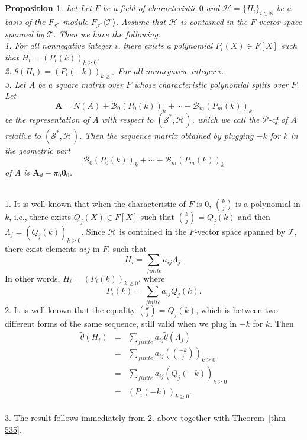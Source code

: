 \documentclass[12pt]{amsart}
\newtheorem{prop}[thrm]{Proposition}
\theoremstyle{definition}
\numberwithin{equation}{section}
\numberwithin{equation}{section}
\begin{document}
\begin{prop}\label{Prop : 010}  Let Let $F$ be a field of characteristic $0$ and $\mathcal{H}=\{H_{i}\}_{i\in \mathbb{N}}$ be a basis of the $F_{\mathcal{S}^{\ast}}$-module $F_{\mathcal{S}^{\ast}}\langle \mathcal{T} \rangle$. Assume that $\mathcal{H}$ is contained in the $F$-vector space spanned by $\mathcal{T}$. Then we have the following:
\\1. For all nonnegative integer $i$, there exists a polynomial $P_{i}(X)\in F[X]$ such that $H_{i}=(P_{i}(k))_{k\geq0}$.
\\2. $\widetilde{\theta}(H_{i})=(P_{i}(-k))_{k\geq0}$ For all nonnegative integer $i$.
\\3. Let $A$ be a square matrix over $F$ whose characteristic polynomial splits over $F$. Let $$\pmb{A}= N(A) + \mathcal{B}_{0}(P_{0}(k))_{k} + \cdots + \mathcal{B}_{m}(P_{m}(k))_{k}$$ be the representation of $A$ with respect to $(\mathcal{S}^{\ast}, \mathcal{H})$, which we call the $\mathcal{P}$-cf of $A$ relative to $(\mathcal{S}^{\ast}, \mathcal{H})$. Then the sequence matrix obtained by plugging $-k$ for $k$ in the geometric part $$\mathcal{B}_{0}(P_{0}(k))_{k} + \cdots + \mathcal{B}_{m}(P_{m}(k))_{k}$$ of $A$ is $\pmb{A}_{d}-\pi_{0}\pmb{0}_{0}$.
\end{prop}
\proof~
\\1. It is well known that when the characteristic of $F$ is $0$, $\binom{k}{j}$ is a polynomial in $k$, i.e., there exists $Q_{j}(X)\in F[X]$ such that $\binom{k}{j}=Q_{j}(k)$ and then $\Lambda_{j}=(Q_{j}(k))_{k\geq 0}$. Since $\mathcal{H}$ is contained in the $F$-vector space spanned by $\mathcal{T}$, there exist elements $aij$ in $F$, such that
$$H_{i}=\sum_{finite} a_{ij}\Lambda_{j}.$$
In other words, $H_{i}=(P_{i}(k))_{k\geq0}$, where
$$P_{i}(k)=\sum_{finite} a_{ij}Q_{j}(k).$$
2. It is well known that the equality $\binom{k}{j}=Q_{j}(k)$, which is between two different forms of the same sequence, still valid when we plug in $-k$ for $k$. Then
\begin{eqnarray*}
\widetilde{\theta}(H_{i})&=&\sum_{finite} a_{ij}\widetilde{\theta}(\Lambda_{j})\\
&=&\sum_{finite} a_{ij}(\binom{-k}{j})_{k\geq 0}\\
&=&\sum_{finite} a_{ij}(Q_{j}(-k))_{k\geq 0}\\
&=&(P_{i}(-k))_{k\geq 0}.
\end{eqnarray*}
\\3. The result follows immediately from $2.$ above together with Theorem~\ref{thm 535}.
\endproof
\end{document}
